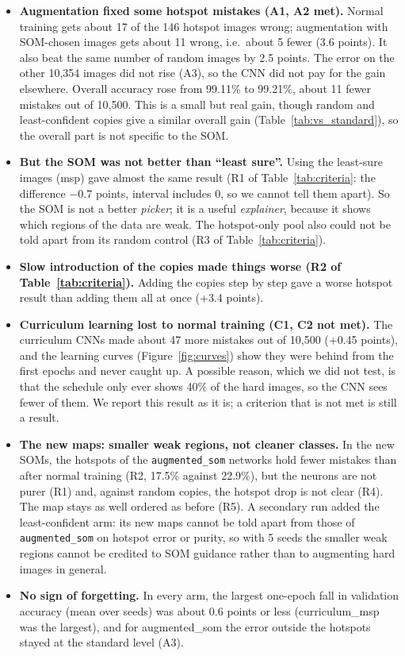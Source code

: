 \documentclass[11pt]{article}
\begin{document}
\begin{itemize}[leftmargin=1.4em, itemsep=2pt]
  \item \textbf{Augmentation fixed some hotspot mistakes (A1, A2 met).} Normal training gets about 17 of the 146 hotspot images wrong; augmentation with SOM-chosen images gets about 11 wrong, i.e.\ about 5 fewer (3.6 points). It also beat the same number of random images by 2.5 points. The error on the other 10{,}354 images did not rise (A3), so the CNN did not pay for the gain elsewhere. Overall accuracy rose from 99.11\% to 99.21\%, about 11 fewer mistakes out of 10{,}500. This is a small but real gain, though random and least-confident copies give a similar overall gain (Table~\ref{tab:vs_standard}), so the overall part is not specific to the SOM.
  \item \textbf{But the SOM was not better than ``least sure''.} Using the least-sure images (msp) gave almost the same result (R1 of Table~\ref{tab:criteria}: the difference $-0.7$ points, interval includes 0, so we cannot tell them apart). So the SOM is not a better \emph{picker}; it is a useful \emph{explainer}, because it shows which regions of the data are weak. The hotspot-only pool also could not be told apart from its random control (R3 of Table~\ref{tab:criteria}).
  \item \textbf{Slow introduction of the copies made things worse (R2 of Table~\ref{tab:criteria}).} Adding the copies step by step gave a worse hotspot result than adding them all at once (+3.4 points).
  \item \textbf{Curriculum learning lost to normal training (C1, C2 not met).} The curriculum CNNs made about 47 more mistakes out of 10{,}500 (+0.45 points), and the learning curves (Figure~\ref{fig:curves}) show they were behind from the first epochs and never caught up. A possible reason, which we did not test, is that the schedule only ever shows 40\% of the hard images, so the CNN sees fewer of them. We report this result as it is; a criterion that is not met is still a result.
  \item \textbf{The new maps: smaller weak regions, not cleaner classes.} In the new SOMs, the hotspots of the \texttt{augmented\_som} networks hold fewer mistakes than after normal training (R2, 17.5\% against 22.9\%), but the neurons are not purer (R1) and, against random copies, the hotspot drop is not clear (R4). The map stays as well ordered as before (R5). A secondary run added the least-confident arm: its new maps cannot be told apart from those of \texttt{augmented\_som} on hotspot error or purity, so with 5 seeds the smaller weak regions cannot be credited to SOM guidance rather than to augmenting hard images in general.
  \item \textbf{No sign of forgetting.} In every arm, the largest one-epoch fall in validation accuracy (mean over seeds) was about 0.6 points or less (curriculum\_msp was the largest), and for augmented\_som the error outside the hotspots stayed at the standard level (A3).
\end{itemize}
\end{document}
